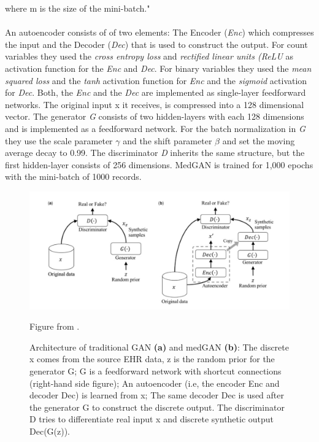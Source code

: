 \documentclass[11pt, a4paper]{book}
\begin{document}
where m is the size of the mini-batch." \cite{Choi2017}
\\
\\
An autoencoder consists of of two elements: The Encoder (\textit{Enc}) which compresses the input and the Decoder (\textit{Dec}) that is used to construct the output.
For count variables they used the \textit{cross entropy loss} and \textit{rectified linear units (ReLU}  as activation function for the \textit{Enc} and \textit{Dec}.
For binary variables they used the \textit{mean squared loss} and the \textit{tanh} activation function for \textit{Enc} and the \textit{sigmoid} activation for \textit{Dec}.
Both, the \textit{Enc} and the \textit{Dec} are implemented as single-layer feedforward networks. The original input x it receives, is compressed into a 128 dimensional vector. The generator \textit{G} consists of two hidden-layers with each 128 dimensions and is implemented as a feedforward network. For the batch normalization in \textit{G} they use the scale parameter  $\gamma$ and the shift parameter $\beta$ and set the moving average decay to 0.99. The discriminator \textit{D} inherits the same structure, but the first hidden-layer consists of 256 dimensions. MedGAN is trained for 1,000 epochs with the mini-batch of 1000 records. \cite{Choi2017}
\begin{figure}
  \begin{center}
  \includegraphics[width=1\textwidth]{img/ganVSmedgan.png}
  \caption{Architecture of traditional GAN \textbf{(a)} and medGAN \textbf{(b)}: The discrete x comes from the source EHR data, z is the random prior for the generator G; G is a feedforward network with shortcut connections (right-hand side figure); An autoencoder (i.e, the encoder Enc and decoder Dec) is learned from x; The same decoder Dec is used after the generator G to construct the discrete output. The discriminator D tries to differentiate real input x and discrete synthetic output Dec(G(z)).  \cite{Choi2017}} Figure from \citep{Baowaly2018}.
  \label{fig:medgan-architecture}
  \end{center}
\end{figure}
\end{document}
